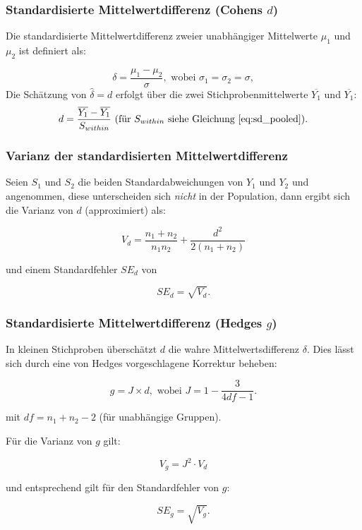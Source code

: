 \begin{frame}\frametitle{Standardisierte Mittelwertdifferenz (Cohens $d$)}

  Die standardisierte Mittelwertdifferenz zweier unabhängiger Mittelwerte
  $\mu_1$ und $\mu_2$ ist definiert als:

   \begin{equation}
     \delta = \frac{\mu_1 - \mu_2}{\sigma}, \text{ wobei } \sigma_1 = \sigma_2 =\sigma,
   \end{equation}
   Die Schätzung von $\widehat{\delta} = d$ erfolgt über die zwei
   Stichprobenmittelwerte $\overline{Y_1}$ und $\overline{Y_1}$:
   \begin{equation}
     d = \frac{\overline{Y_1} - \overline{Y_1}}{S_{within}} \text{ (für $S_{within}$ siehe Gleichung \ref{eq:sd_pooled})}.
   \end{equation}
 
 \end{frame}

 
 \begin{frame}\frametitle{Varianz der standardisierten
     Mittelwertdifferenz}

   Seien $S_1$ und $S_2$ die beiden Standardabweichungen von $Y_1$ und $Y_2$ und
   angenommen, diese unterscheiden sich \emph{nicht} in der Population, dann
   ergibt sich die Varianz von $d$ (approximiert) als:
    
   \begin{equation}
      V_d = \frac{n_1 + n_2}{n_1n_2}+ \frac{d^2}{2(n_1+n_2)} 
    \end{equation}
    
    und einem Standardfehler $SE_d$ von
    
    \begin{equation}
      SE_d=\sqrt{V_d}.
    \end{equation}
    
\end{frame}



 \begin{frame}\frametitle{Standardisierte Mittelwertdifferenz (Hedges $g$)}

   In kleinen Stichproben überschätzt $d$ die wahre Mittelwertsdifferenz
   $\delta$. Dies lässt sich durch eine von Hedges vorgeschlagene Korrektur
   beheben:
   
   \begin{equation}
     g = J \times d, \text{ wobei } J = 1-\frac{3}{4df - 1}.
   \end{equation}
   
   mit $df=n_1 + n_2 - 2$ (für unabhängige Gruppen). 
   
   Für die Varianz von $g$ gilt:
   
   \begin{equation}
     V_g=J^2 \cdot V_d
   \end{equation}
   
   und entsprechend gilt für den Standardfehler von $g$:
   
   \begin{equation}
     SE_g=\sqrt{V_g}.
   \end{equation}
 \end{frame}
 
